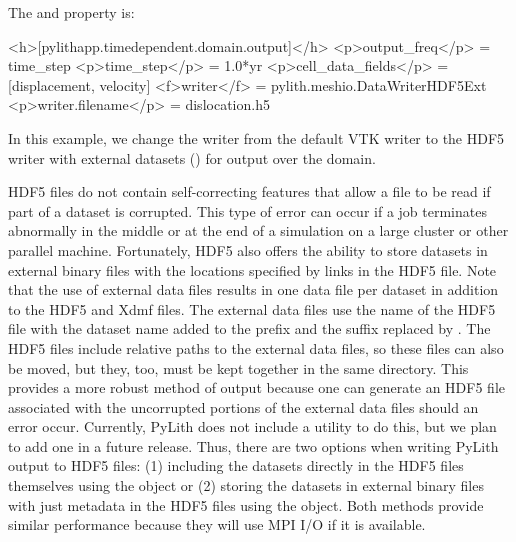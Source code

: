 The  and  property is:
\begin{inventory}
\end{inventory}

\begin{cfg}
<h>[pylithapp.timedependent.domain.output]</h>
<p>output_freq</p> = time_step
<p>time_step</p> = 1.0*yr
<p>cell_data_fields</p> = [displacement, velocity]
<f>writer</f> = pylith.meshio.DataWriterHDF5Ext
<p>writer.filename</p> = dislocation.h5
\end{cfg}
In this example, we change the writer from the default VTK writer to
the HDF5 writer with external datasets ()
for output over the domain.

HDF5 files do not contain self-correcting features that allow a file
to be read if part of a dataset is corrupted. This type of error can
occur if a job terminates abnormally in the middle or at the end of a
simulation on a large cluster or other parallel machine. Fortunately,
HDF5 also offers the ability to store datasets in external binary
files with the locations specified by links in the HDF5 file. Note
that the use of external data files results in one data file per
dataset in addition to the HDF5 and Xdmf files. The external data
files use the name of the HDF5 file with the dataset name added to the
prefix and the  suffix replaced by . The
HDF5 files include relative paths to the external data files, so these
files can also be moved, but they, too, must be kept together in the
same directory. This provides a more robust method of output because
one can generate an HDF5 file associated with the uncorrupted portions
of the external data files should an error occur. Currently, PyLith
does not include a utility to do this, but we plan to add one in a
future release. Thus, there are two options when writing PyLith output
to HDF5 files: (1) including the datasets directly in the HDF5 files
themselves using the  object or (2) storing the
datasets in external binary files with just metadata in the HDF5 files
using the  object. Both methods provide
similar performance because they will use MPI I/O if it is available.


